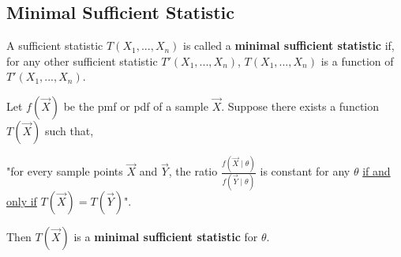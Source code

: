 \documentclass[11pt]{elegantbook}
\begin{document}
\subsection{Minimal Sufficient Statistic}
\begin{definition}
    \normalfont
    A sufficient statistic $T(X_1,...,X_n)$ is called a \textbf{minimal sufficient statistic} if, for any other sufficient statistic $T'(X_1,...,X_n)$, $T(X_1,...,X_n)$ is a function of $T'(X_1,...,X_n)$.
\end{definition}

\begin{theorem}
    Let $f(\vec{X})$ be the pmf or pdf of a sample $\vec{X}$. Suppose there exists a function $T(\vec{X})$ such that,
    \begin{center}
        "for every sample points $\vec{X}$ and $\vec{Y}$, the ratio $\frac{f(\vec{X}\mid\theta)}{f(\vec{Y}\mid\theta)}$ is constant for any $\theta$ \underline{if and only if} $T(\vec{X}) = T(\vec{Y})$".
    \end{center}
    Then $T(\vec{X})$ is a \textbf{minimal sufficient statistic} for $\theta$.
\end{theorem}
\end{document}
